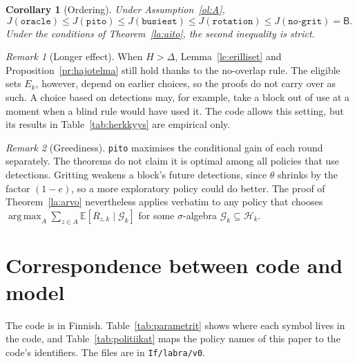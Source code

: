 \documentclass[11pt,a4paper]{article}
\theoremstyle{plain}
\newtheorem{seuraus}{Corollary}
\theoremstyle{definition}
\theoremstyle{remark}
\newtheorem{huomautus}{Remark}
\newcommand{\E}{\mathbb{E}}
\newcommand{\cG}{\mathcal{G}}
\newcommand{\cH}{\mathcal{H}}
\newcommand{\1}{\mathbf{1}}
\newcommand{\pol}[1]{\texttt{#1}}
\DeclareMathOperator*{\argmax}{arg\,max}
\begin{document}
\begin{seuraus}[Ordering]\label{se:jarjestys}
Under Assumption~\ref{ol:A},
\[
  J(\pol{oracle}) \le J(\pol{pito}) \le J(\pol{busiest}) \le J(\pol{rotation}) \le J(\pol{no-grit}) = \mathsf{B}.
\]
Under the conditions of Theorem~\ref{la:aito}, the second inequality is strict.
\end{seuraus}

\begin{huomautus}[Longer effect]\label{hu:H}
When $H > \Delta$, Lemma~\ref{le:erilliset} and Proposition~\ref{pr:hajotelma}
still hold thanks to the no-overlap rule. The eligible sets $E_k$, however,
depend on earlier choices, so the proofs do not carry over as such. A choice
based on detections may, for example, take a block out of use at a moment when a
blind rule would have used it. The code allows this setting, but its results in
Table~\ref{tab:herkkyys} are empirical only.
\end{huomautus}

\begin{huomautus}[Greediness]
\pol{pito} maximises the conditional gain of each round separately. The theorems
do not claim it is optimal among all policies that use detections. Gritting
weakens a block's future detections, since $\theta$ shrinks by the factor
$(1-e)$, so a more exploratory policy could do better. The proof of
Theorem~\ref{la:arvo} nevertheless applies verbatim to any policy that chooses
$\argmax_A \sum_{z\in A}\E[R_{z,k} \mid \cG_k]$ for some $\sigma$-algebra
$\cG_k \subseteq \cH_k$.
\end{huomautus}

\section{Correspondence between code and model}\label{sec:koodi}

The code is in Finnish. Table~\ref{tab:parametrit} shows where each symbol
lives in the code, and Table~\ref{tab:politiikat} maps the policy names of this
paper to the code's identifiers. The files are in \texttt{If/labra/v0}.
\end{document}
